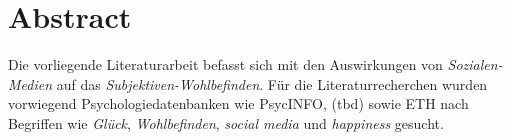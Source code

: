 %
%

\thispagestyle{empty}
\chapter*{Abstract}\label{abstract}
Die vorliegende Literaturarbeit befasst sich mit den Auswirkungen von \textit{Sozialen-Medien} auf das \textit{Subjektiven-Wohlbefinden}. Für die Literaturrecherchen wurden vorwiegend Psychologiedatenbanken wie PsycINFO, (tbd) sowie ETH nach Begriffen wie \textit{Glück}, \textit{Wohlbefinden}, \textit{social media} und \textit{happiness} gesucht. 

